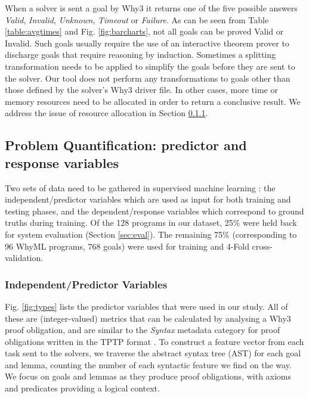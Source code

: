 \documentclass[submission,copyright,creativecommons]{eptcs}
\begin{document}
When a solver is sent a goal by \textsf{Why3} it returns one of the five possible answers \textit{Valid},  \textit{Invalid},  \textit{Unknown},  \textit{Timeout} or  \textit{Failure}. As can be seen from Table \ref{table:avgtimes} and Fig. \ref{fig:barcharts}, not all goals can be proved Valid or Invalid. Such goals usually require the use of an interactive theorem prover to discharge goals that require reasoning by induction. Sometimes a splitting transformation needs to be applied to simplify the goals before they are sent to the solver. Our tool does not perform any transformations to goals other than those defined by the solver's \textsf{Why3} driver file. In other cases, more time or memory resources need to be allocated in order to return a conclusive result. We address the issue of resource allocation in Section \ref{sec:independant}.     

\subsection{Problem Quantification: predictor and response variables}

Two sets of data need to be gathered in supervised machine learning \cite{Mitchell}: the independent/predictor variables which are used as input for both training and testing phases, and the dependent/response variables which correspond to ground truths during training. Of the 128 programs in our dataset, 25\% were held back for system evaluation (Section \ref{sec:eval}). The remaining 75\% (corresponding to 96 WhyML programs, 768 goals) were used for training and 4-Fold cross-validation.

\subsubsection{Independent/Predictor Variables}
\label{sec:independant}
Fig. \ref{fig:types} lists the predictor variables that were used in our study.  All of these are (integer-valued) metrics that can be calculated by analysing a \textsf{Why3} proof obligation, and are similar to the \textit{Syntax} metadata category for proof obligations written in the TPTP format \cite{TPTP}.
To construct a feature vector from each task sent to the solvers, we traverse the abstract syntax tree (AST) for each goal and lemma, counting the number of each syntactic feature we find on the way. We 
focus on goals and lemmas as they produce proof obligations, with axioms and predicates providing a logical context.
\end{document}
